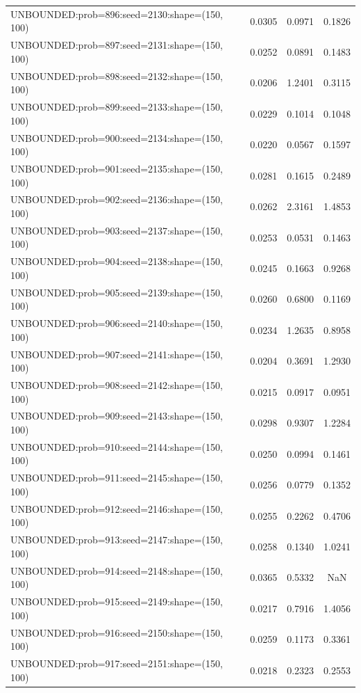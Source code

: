 \begin{longtable}{lccc}
UNBOUNDED:prob=896:seed=2130:shape=(150, 100) &   0.0305 &  0.0971 &  0.1826 \\
UNBOUNDED:prob=897:seed=2131:shape=(150, 100) &   0.0252 &  0.0891 &  0.1483 \\
UNBOUNDED:prob=898:seed=2132:shape=(150, 100) &   0.0206 &  1.2401 &  0.3115 \\
UNBOUNDED:prob=899:seed=2133:shape=(150, 100) &   0.0229 &  0.1014 &  0.1048 \\
UNBOUNDED:prob=900:seed=2134:shape=(150, 100) &   0.0220 &  0.0567 &  0.1597 \\
UNBOUNDED:prob=901:seed=2135:shape=(150, 100) &   0.0281 &  0.1615 &  0.2489 \\
UNBOUNDED:prob=902:seed=2136:shape=(150, 100) &   0.0262 &  2.3161 &  1.4853 \\
UNBOUNDED:prob=903:seed=2137:shape=(150, 100) &   0.0253 &  0.0531 &  0.1463 \\
UNBOUNDED:prob=904:seed=2138:shape=(150, 100) &   0.0245 &  0.1663 &  0.9268 \\
UNBOUNDED:prob=905:seed=2139:shape=(150, 100) &   0.0260 &  0.6800 &  0.1169 \\
UNBOUNDED:prob=906:seed=2140:shape=(150, 100) &   0.0234 &  1.2635 &  0.8958 \\
UNBOUNDED:prob=907:seed=2141:shape=(150, 100) &   0.0204 &  0.3691 &  1.2930 \\
UNBOUNDED:prob=908:seed=2142:shape=(150, 100) &   0.0215 &  0.0917 &  0.0951 \\
UNBOUNDED:prob=909:seed=2143:shape=(150, 100) &   0.0298 &  0.9307 &  1.2284 \\
UNBOUNDED:prob=910:seed=2144:shape=(150, 100) &   0.0250 &  0.0994 &  0.1461 \\
UNBOUNDED:prob=911:seed=2145:shape=(150, 100) &   0.0256 &  0.0779 &  0.1352 \\
UNBOUNDED:prob=912:seed=2146:shape=(150, 100) &   0.0255 &  0.2262 &  0.4706 \\
UNBOUNDED:prob=913:seed=2147:shape=(150, 100) &   0.0258 &  0.1340 &  1.0241 \\
UNBOUNDED:prob=914:seed=2148:shape=(150, 100) &   0.0365 &  0.5332 &     NaN \\
UNBOUNDED:prob=915:seed=2149:shape=(150, 100) &   0.0217 &  0.7916 &  1.4056 \\
UNBOUNDED:prob=916:seed=2150:shape=(150, 100) &   0.0259 &  0.1173 &  0.3361 \\
UNBOUNDED:prob=917:seed=2151:shape=(150, 100) &   0.0218 &  0.2323 &  0.2553 \\

\end{longtable}
